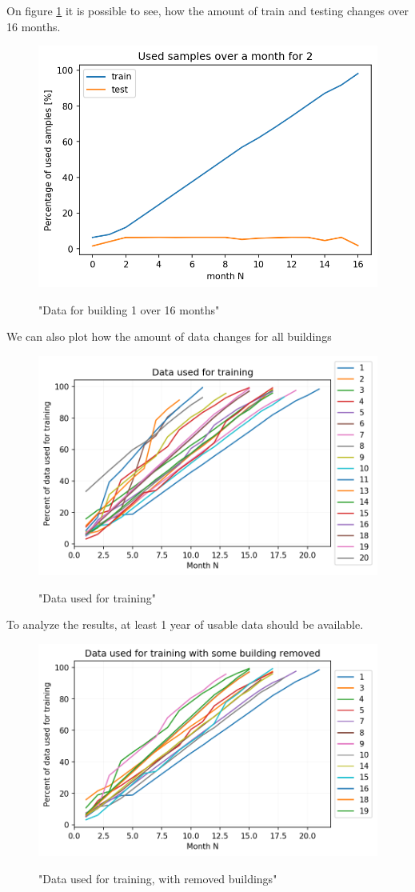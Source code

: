 On figure \ref{fig:dyn_data_1} it is possible to see,
how the amount of train and testing changes over 16 months.

\begin{figure}[H]
	\centering
	\caption{"Data for building 1 over 16 months"}
	\includegraphics[width=.7\textwidth]{Figures/EC/DYN/tst_tr_b1.png}
	\label{fig:dyn_data_1}
\end{figure}

We can also plot how the amount of data changes for all buildings 

\begin{figure}[H]
	\centering
	\caption{"Data used for training"}
	\includegraphics[width=.7\textwidth]{Figures/EC/DYN/data_used_for_training_all.png}
	\label{fig:data_used_for_training}
\end{figure}

To analyze the results, at least 1 year of usable data should be available. 

\begin{figure}[H]
	\centering
	\caption{"Data used for training, with removed buildings"}
	\includegraphics[width=.7\textwidth]{Figures/EC/DYN/data_used_for_training_removed_short.png}
	\label{fig:data_used_for_training_removed}
\end{figure}

